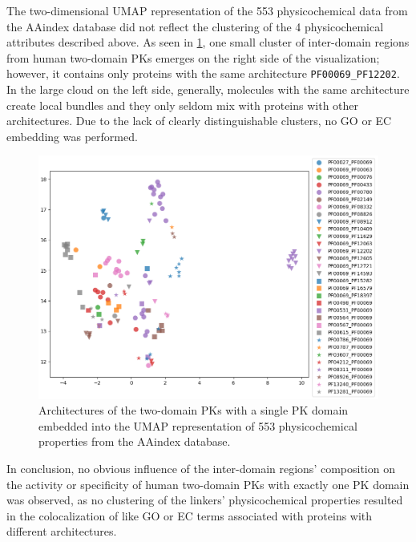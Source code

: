 	The two-dimensional UMAP representation of the 553 physicochemical data from the AAindex
	database did not reflect the clustering of the 4 physicochemical attributes described
	above.
	As seen in \cref{fig:aa_umap}, one small cluster of inter-domain regions from human
	two-domain PKs emerges on the right side of the visualization; however, it contains only
	proteins with the same architecture \texttt{PF00069\_PF12202}.
	In the large cloud on the left side, generally, molecules with the same architecture
	create local bundles and they only seldom mix with proteins with other architectures.
	Due to the lack of clearly distinguishable clusters, no GO or EC embedding was
	performed.

	\begin{figure}
		\centering
		\includegraphics[width=\linewidth]{img/aa_umap_arch.png}
		\caption{Architectures of the two-domain PKs with a single PK domain embedded into the
		UMAP representation of 553 physicochemical properties from the AAindex database.}
		\label{fig:aa_umap}
	\end{figure}

	In conclusion, no obvious influence of the inter-domain regions' composition on the
	activity or specificity of human two-domain PKs with exactly one PK domain was observed,
	as no clustering of the linkers' physicochemical properties resulted in the
	colocalization of like GO or EC terms associated with proteins with different
	architectures.
